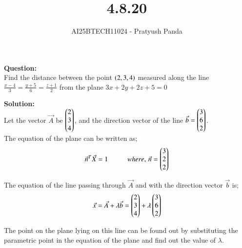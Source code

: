 \documentclass[journal]{IEEEtran}
\begin{document}

\vspace{3cm}

\title{4.8.20}
\author{AI25BTECH11024 - Pratyush Panda
}
\maketitle
{\let\newpage\relax\maketitle}

\renewcommand{\thefigure}{\theenumi}
\renewcommand{\thetable}{\theenumi}
\setlength{\intextsep}{10pt} %


\renewcommand{\thetable}{\theenumi}

\textbf{Question: } \\
Find the distance between the point $\left(2,3,4\right)$ measured along the line $\frac{x-4}{3}=\frac{y+5}{6}=\frac{z+1}{2}$ from the plane $3x+2y+2z+5=0$
\vspace{0.7cm}

\textbf{Solution: } \\
Let the vector $\Vec{A}$ be $\begin{pmatrix}2 \\ 3 \\ 4\end{pmatrix}$, and the direction vector of the line $\Vec{b}=\begin{pmatrix}3 \\ 6 \\ 2\end{pmatrix}$. \\
The equation of the plane can be written as;
\begin{align}
\Vec{n}^T\Vec{X}=1 \hspace{1cm} where, \, \Vec{n}=\begin{pmatrix}3 \\ 2 \\ 2\end{pmatrix}
\end{align}

The equation of the line passing through $\Vec{A}$ and with the direction vector $\Vec{b}$ is;
\begin{align}   
\Vec{x}=\Vec{A}+\lambda\Vec{b}=\begin{pmatrix}2 \\ 3 \\ 4\end{pmatrix}+\lambda\begin{pmatrix}3 \\ 6 \\ 2\end{pmatrix}
\end{align}

The point on the plane lying on this line can be found out by substituting the parametric point in the equation of the plane and find out the value of $\lambda$. \\
\end{document}
